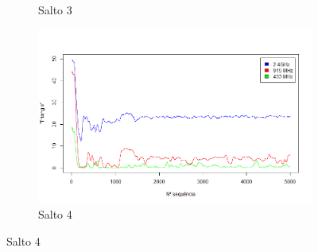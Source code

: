 \documentclass[
	12pt,				%
	openright,			%
	oneside,
	a4paper,			%
	english,			%
	french,				%
	spanish,			%
	brazil				%
	]{abntex2}
\begin{document}
\begin{figure}[b!]
\begin{subfigure}{.5\textwidth}
		\captionsetup{width=.9\textwidth}
		\caption{Salto 3}
		\label{trng_no_opt_s3}
	\end{subfigure}%
	\begin{subfigure}{.5\textwidth}
		\centering
		\includegraphics[width=.98\linewidth]{TRNG_Salto4}
		\captionsetup{width=.9\textwidth}
		\caption{Salto 4}
		\label{trng_no_opt_s4}
	\end{subfigure}
\end{figure}
\end{document}
